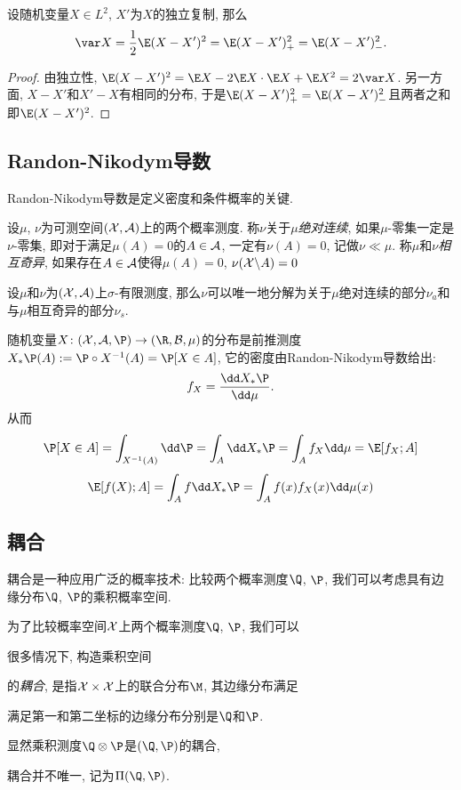 \begin{lemma}[独立复制]
	设随机变量$X \in L^2$, $X'$为$X$的独立复制, 那么
	\begin{equation*}
		\var X = \frac12 \E (X - X')^2
		= \E (X - X')_+^2 = \E (X - X')_-^2. 
	\end{equation*}
\end{lemma}
\begin{proof}
	由独立性, $\E (X - X')^2 = \E X - 2 \E X \cdot \E X + \E X^2 = 2 \var X$. 
	另一方面, $X - X'$和$X' - X$有相同的分布, 于是$\E(X - X')_+^2 = \E(X - X')_-^2$且两者之和即$\E (X - X')^2$. 
\end{proof}


\subsection{Randon-Nikodym导数}

Randon-Nikodym导数是定义密度和条件概率的关键. 

设$\mu$, $\nu$为可测空间$(\mathcal{X}, \mathcal{A})$上的两个概率测度. 
称$\nu$关于$\mu$\emph{绝对连续}, 如果$\mu$-零集一定是$\nu$-零集, 即对于满足$\mu(A) = 0$的$A \in \mathcal{A}$, 一定有$\nu(A) = 0$, 记做$\nu \ll \mu$. 
称$\mu$和$\nu$\emph{相互奇异}, 如果存在$A \in \mathcal{A}$使得$\mu(A) = 0$, $\nu(\mathcal{X} \backslash A) = 0$

\begin{theorem}[Lebesgue分解定理]
	设$\mu$和$\nu$为$(\mathcal{X}, \mathcal{A})$上$\sigma$-有限测度, 那么$\nu$可以唯一地分解为关于$\mu$绝对连续的部分$\nu_a$和与$\mu$相互奇异的部分$\nu_s$. 
\end{theorem}

\begin{example}[分布的密度]
	随机变量$X \colon (\cX, \cA, \P) \to (\R, \cB, \mu)$的分布是前推测度$X_* \P (A) := \P \circ X^{-1} (A) = \P[X \in A]$, 它的密度由Randon-Nikodym导数给出: 
	\begin{equation*}
		f_X = \frac{\dd X_* \P}{\dd \mu}. 
	\end{equation*}
	从而
	\begin{equation*}
		\P[X \in A] 
		= \int_{X^{-1}(A)} \dd \P 
		= \int_A \dd X_* \P 
		= \int_A f_X \dd \mu
		= \E[f_X; A]
	\end{equation*}
	\begin{equation*}
		\E[f(X); A]
		= \int_A f \dd X_* \P 
		= \int_A f(x) f_X(x) \dd \mu(x)
	\end{equation*}
\end{example}



\subsection{耦合}

耦合是一种应用广泛的概率技术: 比较两个概率测度$\Q$, $\P$, 我们可以考虑具有边缘分布$\Q$, $\P$的乘积概率空间. 

为了比较概率空间$\mathcal{X}$上两个概率测度$\Q$, $\P$, 我们可以

很多情况下, 构造乘积空间

的\emph{耦合}, 是指$\mathcal{X} \times \mathcal{X}$上的联合分布$\M$, 其边缘分布满足

满足第一和第二坐标的边缘分布分别是$\Q$和$\P$.


显然乘积测度$\Q \otimes \P$是$(\Q, \P)$的耦合, 

耦合并不唯一, 记为$\Pi(\Q, \P)$. 
